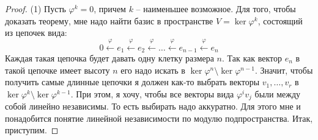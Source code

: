 \begin{proof}
(1) Пусть $\varphi^k = 0$, причем $k$ -- наименьшее возможное. Для того, чтобы доказать теорему, мне надо найти базис в пространстве $V = \ker \varphi^k$, состоящий из цепочек вида:
\[
0\stackrel{\varphi}{\longleftarrow}e_1\stackrel{\varphi}{\longleftarrow}e_2 \stackrel{\varphi}{\longleftarrow}\ldots\stackrel{\varphi}{\longleftarrow}e_{n-1}\stackrel{\varphi}{\longleftarrow}e_n
\]
Каждая такая цепочка будет давать одну клетку размера $n$. Так как вектор $e_n$ в такой цепочке имеет высоту $n$ его надо искать в $\ker \varphi^{n}\setminus\ker\varphi^{n-1}$. Значит, чтобы получить самые длинные цепочки я должен как-то выбрать векторы $v_1,\ldots, v_r$ в $\ker\varphi^k \setminus \ker \varphi^{k-1}$. При этом, я хочу, чтобы все векторы вида $\varphi^i v_j$ были между собой линейно независимы. То есть выбирать надо аккуратно. Для этого мне и понадобится понятие линейной независимости по модулю подпространства. Итак, приступим.


\end{proof}
